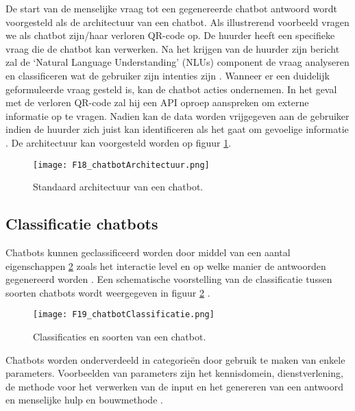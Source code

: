 De start van de menselijke vraag tot een gegenereerde chatbot antwoord wordt voorgesteld als de architectuur van een chatbot. Als illustrerend voorbeeld vragen we als chatbot zijn/haar verloren QR-code op. De huurder heeft een specifieke vraag die de chatbot kan verwerken. Na het krijgen van de huurder zijn bericht zal de ‘Natural Language Understanding’ (NLUs) \autocite{Khanna2015} component de vraag analyseren en classificeren wat de gebruiker zijn intenties zijn \autocite{Tamrakar2021}. Wanneer er een duidelijk geformuleerde vraag gesteld is, kan de chatbot acties ondernemen. In het geval met de verloren QR-code zal hij een API oproep aanspreken om externe informatie op te vragen. Nadien kan de data worden vrijgegeven aan de gebruiker indien de huurder zich juist kan identificeren als het gaat om gevoelige informatie \autocite{Adamopoulou2020}. De architectuur kan voorgesteld worden op figuur \ref{fig:chatbotArchitectuur}.

\begin{figure}[h]
    \centering
    \texttt{[image: F18\_chatbotArchitectuur.png]}
    \captionsetup{justification=ce/brntering, singlelinecheck=false}    
    \caption{Standaard architectuur van een chatbot.}
    \label{fig:chatbotArchitectuur}
\end{figure}

\subsection{Classificatie chatbots}%
\label{sec:chatbotTypes}

Chatbots kunnen geclassificeerd worden door middel van een aantal eigenschappen \ref{fig:chatbotTypes} zoals het interactie level en op welke manier de antwoorden gegenereerd worden \autocite{Nimavat2017}.
Een schematische voorstelling van de classificatie tussen soorten chatbots wordt weergegeven in figuur \ref{fig:chatbotTypes} \autocite{Tamrakar2021}.


\begin{figure}[h]
    \centering
    \texttt{[image: F19\_chatbotClassificatie.png]}
    \captionsetup{justification=ce/brntering, singlelinecheck=false}    
    \caption{Classificaties en soorten van een chatbot.}
    \label{fig:chatbotTypes}
\end{figure}

Chatbots worden onderverdeeld in categorieën door gebruik te maken van enkele parameters. Voorbeelden van parameters zijn het kennisdomein, dienstverlening, de methode voor het verwerken van de input en het genereren van een antwoord en menselijke hulp en bouwmethode \autocite{Adamopoulou2020}. 

